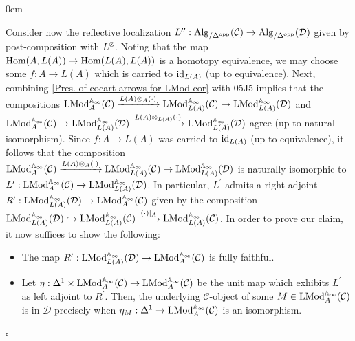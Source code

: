 \documentclass[10pt]{article}
\newcommand{\C}{\mathcal C}
\newcommand{\cD}{\mathcal{D}}
\def\AA{{\mathbb A}}
\renewcommand{\qed}{\hfill$\square$}
\renewenvironment{proof}{\begin{addmargin}[1em]{0em}\begin{newproof}}{\end{newproof}\end{addmargin}\qed}
\theoremstyle{witharg}
\theoremstyle{witharg}
\theoremstyle{witharg2}
\begin{document}
\begin{proof}
Consider now the reflective localization $L^{\prime\prime}:\textnormal{Alg}_{/\Delta^{\textnormal{opp}}}(\C)\rightarrow \textnormal{Alg}_{/\Delta^{\textnormal{opp}}}(\cD)$ given by post-composition with $L^{\otimes}$. Noting that the map $\textnormal{Hom}(A,L(A))\rightarrow \textnormal{Hom}(L(A),L(A))$ is a homotopy equivalence, we may choose some $f:A\rightarrow L(A)$ which is carried to $\textnormal{id}_{L(A)}$ (up to equivalence). Next, combining \ref{Pres. of cocart arrows for LMod cor} with  05J5 implies that the compositions $\textnormal{LMod}^{\AA_\infty}_A(\C)\xrightarrow{L(A)\otimes_A(\cdot)}\textnormal{LMod}^{\AA_\infty}_{L(A)}(\C)\rightarrow \textnormal{LMod}^{\AA_\infty}_{L(A)}(\cD)$ and $\textnormal{LMod}^{\AA_\infty}_A(\C)\rightarrow \textnormal{LMod}^{\AA_\infty}_{L(A)}(\cD)\xrightarrow{L(A)\otimes_{L(A)}(\cdot)}\textnormal{LMod}^{\AA_\infty}_{L(A)}(\cD)$ agree (up to natural isomorphism). Since $f:A\rightarrow L(A)$ was carried to $\textnormal{id}_{L(A)}$ (up to equivalence), it follows that the composition $\textnormal{LMod}^{\AA_\infty}_A(\C)\xrightarrow{L(A)\otimes_A(\cdot)}\textnormal{LMod}^{\AA_\infty}_{L(A)}(\C)\rightarrow \textnormal{LMod}^{\AA_\infty}_{L(A)}(\cD)$ is naturally isomorphic to $L^\prime:\textnormal{LMod}^{\AA_\infty}_{A}(\C)\rightarrow \textnormal{LMod}^{\AA_\infty}_{L(A)}(\cD)$. In particular, $L^\prime$ admits a right adjoint $R^\prime:\textnormal{LMod}^{\AA_\infty}_{L(A)}(\cD)\rightarrow \textnormal{LMod}^{\AA_\infty}_{A}(\C)$ given by the composition $\textnormal{LMod}^{\AA_\infty}_{L(A)}(\cD)\hookrightarrow \textnormal{LMod}^{\AA_\infty}_{L(A)}(\C)\xrightarrow{(\cdot)|_{A}}\textnormal{LMod}^{\AA_\infty}_{L(A)}(\C)$. In order to prove our claim, it now suffices to show the following:

\begin{itemize}

    \item [$(i)$] The map $R^\prime:\textnormal{LMod}^{\AA_\infty}_{L(A)}(\cD)\rightarrow \textnormal{LMod}^{\AA_\infty}_{A}(\C)$ is fully faithful. 

    \item [$(ii)$] Let $\eta:\Delta^1\times \textnormal{LMod}^{\AA_\infty}_{A}(\C)\rightarrow \textnormal{LMod}^{\AA_\infty}_{A}(\C)$ be the unit map which exhibits $L^\prime$ as left adjoint to $R^\prime$. Then, the underlying $\C$-object of some $M\in \textnormal{LMod}^{\AA_\infty}_{A}(\C)$ is in $\cD$ precisely when $\eta_M:\Delta^1\rightarrow \textnormal{LMod}^{\AA_\infty}_{A}(\C)$ is an isomorphism. 
    

\end{itemize}
\end{proof}
\end{document}
